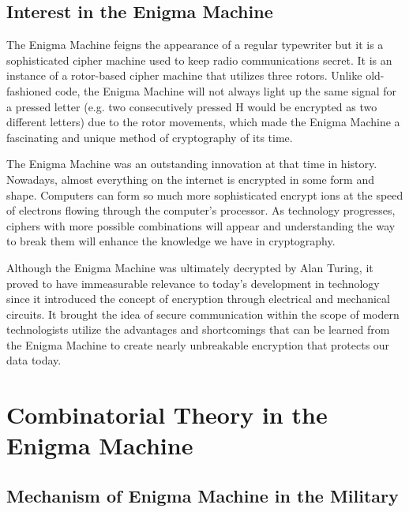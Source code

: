 \documentclass{article}
\begin{document}
\subsection{Interest in the Enigma Machine}
The Enigma Machine feigns the appearance of a regular typewriter but it is a sophisticated cipher machine used to keep radio communications secret. It is an instance of a rotor-based cipher machine that utilizes three rotors. Unlike old-fashioned code, the Enigma Machine will not always light up the same signal for a pressed letter (e.g. two consecutively pressed H would be encrypted as two different letters) due to the rotor movements, which made the Enigma Machine a fascinating and unique method of cryptography of its time.\\
\par The Enigma Machine was an outstanding innovation at that time in history. Nowadays, almost everything on the internet is encrypted in some form and shape. Computers can form so much more sophisticated encrypt ions at the speed of electrons flowing through the computer's processor. As technology progresses, ciphers with more possible combinations will appear and understanding the way to break them will enhance the knowledge we have in cryptography. \\
\par Although the Enigma Machine was ultimately decrypted by Alan Turing, it proved to have immeasurable relevance to today’s development in technology since it introduced the concept of encryption through electrical and mechanical circuits. It brought the idea of secure communication within the scope of modern technologists utilize the advantages and shortcomings that can be learned from the Enigma Machine to create nearly unbreakable encryption that protects our data today.

\section{Combinatorial Theory in the Enigma Machine}

\subsection{Mechanism of Enigma Machine in the Military}
\end{document}
